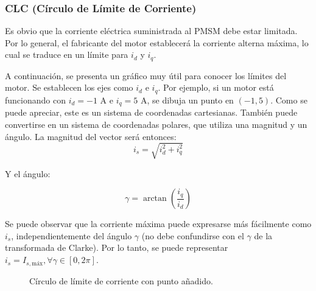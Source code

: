 \subsubsection{CLC (Círculo de Límite de Corriente)}

Es obvio que la corriente eléctrica suministrada al PMSM debe estar limitada. Por lo general, el fabricante del motor establecerá la corriente alterna máxima, lo cual se traduce en un límite para \(i_d\) y \(i_q\).

A continuación, se presenta un gráfico muy útil para conocer los límites del motor. Se establecen los ejes como $i_d$ e $i_q$. Por ejemplo, si un motor está funcionando con $i_d = -1 \text{ A}$ e $i_q = 5 \text{ A}$, se dibuja un punto en $(-1,5)$. Como se puede apreciar, este es un sistema de coordenadas cartesianas. También puede convertirse en un sistema de coordenadas polares, que utiliza una magnitud y un ángulo. La magnitud del vector será entonces:
\begin{equation}
i_{s} = \sqrt{i_d^2+i_q^2}
\end{equation}

Y el ángulo:

\begin{equation}
\gamma = \arctan\left(\frac{i_q}{i_d}\right)
\end{equation}

Se puede observar que la corriente máxima puede expresarse más fácilmente como $i_s$, independientemente del ángulo $\gamma$ (no debe confundirse con el $\gamma$ de la transformada de Clarke). Por lo tanto, se puede representar $i_s = I_{s,\text{máx}} , \forall \gamma \in [0,2\pi]$.

\begin{figure}[H]
	\centering
	\caption{Círculo de límite de corriente con punto añadido.}
	\label{i_polar}
\end{figure}



